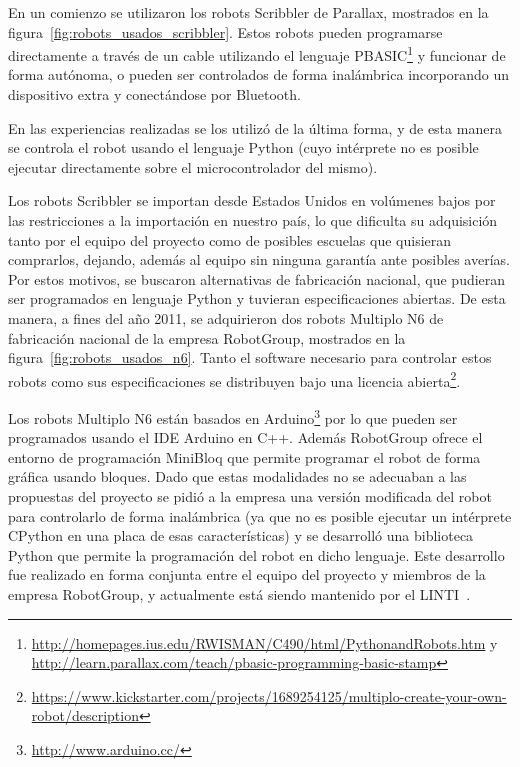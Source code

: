 En un comienzo se utilizaron los robots Scribbler de Parallax, mostrados en
la figura~\ref{fig:robots_usados_scribbler}. Estos robots pueden programarse
directamente a través de un cable utilizando el lenguaje
PBASIC\footnote{\url{http://homepages.ius.edu/RWISMAN/C490/html/PythonandRobots.htm}
y\\ \url{http://learn.parallax.com/teach/pbasic-programming-basic-stamp}}
y funcionar de forma autónoma, o pueden ser controlados de forma
inalámbrica incorporando un dispositivo extra y conectándose por Bluetooth.

En las experiencias realizadas se los utilizó de
la última
forma, y de esta manera se controla el robot usando el lenguaje Python
(cuyo intérprete no
es posible ejecutar directamente sobre el microcontrolador del mismo).

Los robots Scribbler se importan desde Estados Unidos en volúmenes bajos
por las restricciones a la importación en nuestro país, lo que
dificulta su adquisición tanto por el equipo del proyecto como de posibles
escuelas que quisieran comprarlos, dejando, además al equipo sin ninguna
garantía
ante posibles averías. Por estos motivos, se buscaron alternativas de
fabricación nacional,
que pudieran ser programados en lenguaje Python y tuvieran especificaciones
abiertas.
De esta manera, a fines del año 2011, se adquirieron dos robots Multiplo N6
de fabricación nacional de
la empresa RobotGroup, mostrados en la figura~\ref{fig:robots_usados_n6}.
Tanto el software necesario para controlar estos robots como sus
especificaciones se distribuyen bajo una licencia
abierta\footnote{\url{https://www.kickstarter.com/projects/1689254125/multiplo-create-your-own-robot/description}}.

Los robots Multiplo N6 están basados en
Arduino\footnote{\url{http://www.arduino.cc/}}
por lo que pueden ser programados
usando el IDE Arduino en C++. Además RobotGroup ofrece el entorno de programación
MiniBloq que permite programar el robot de forma gráfica usando bloques.
Dado que estas modalidades no se adecuaban a las propuestas del proyecto
se pidió a la empresa una versión modificada del robot para controlarlo de forma
inalámbrica (ya que no es posible ejecutar un intérprete CPython en una
placa de esas características) y se
desarrolló
una biblioteca Python que permite la programación del robot en dicho lenguaje. Este
desarrollo fue realizado en forma conjunta entre el equipo del proyecto \proyecto{}
y miembros de la empresa RobotGroup, y actualmente está
siendo mantenido por el LINTI~\citep{diaz_aprendiendo_2012}.

